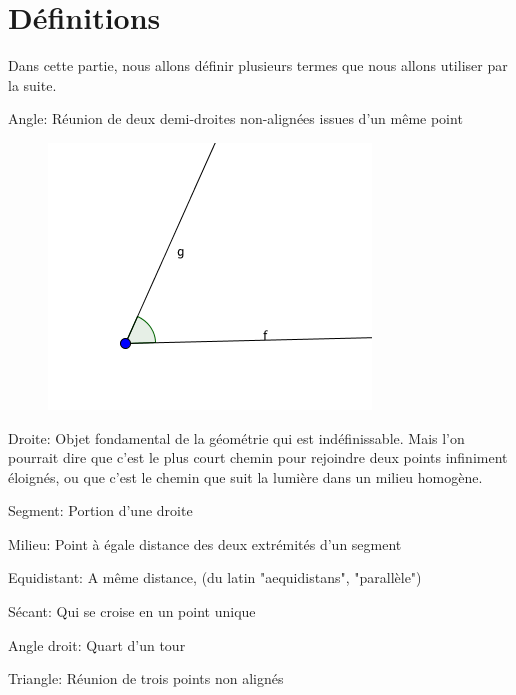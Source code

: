 \documentclass[a4paper,12pt]{article}
\begin{document}
\section{Définitions}
Dans cette partie, nous allons définir plusieurs termes que nous allons utiliser par la suite.\\

\begin{definition}{Angle:}
Réunion de deux demi-droites non-alignées issues d'un même point
\begin{figure}[H]
    \centering
    \includegraphics[scale=0.4]{definitions/angle.png}
\end{figure}
\end{definition}
\begin{definition}{Droite:}
Objet fondamental de la géométrie qui est indéfinissable. Mais l'on pourrait dire que c'est le plus court chemin pour rejoindre deux points infiniment éloignés, ou que c'est le chemin que suit la lumière dans un milieu homogène.
\end{definition}
\begin{definition}{Segment:}
Portion d'une droite
\end{definition}
\begin{definition}{Milieu:}
Point à égale distance des deux extrémités d'un segment
\end{definition}
\begin{definition}{Equidistant:}
A même distance, (du latin "aequidistans", "parallèle")
\end{definition}
\begin{definition}{Sécant:}
Qui se croise en un point unique
\end{definition}
\begin{definition}{Angle droit:}
Quart d'un tour
\end{definition}
\begin{definition}{Triangle:}
Réunion de trois points non alignés
\end{definition}
\end{document}
